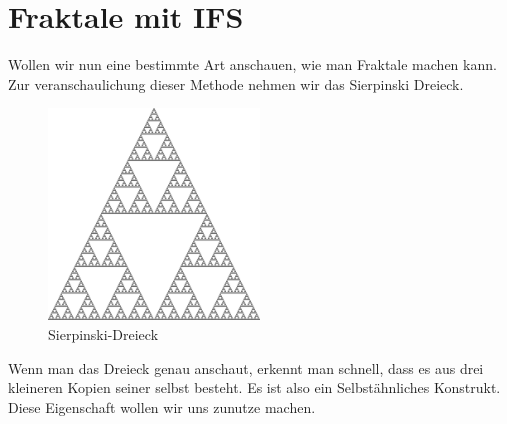 %
%
%
\section{Fraktale mit IFS 
\label{ifs:section:teil2}}
Wollen wir nun eine bestimmte Art anschauen, wie man Fraktale machen kann.
Zur veranschaulichung dieser Methode nehmen wir das Sierpinski Dreieck.
\begin{figure}
	\label{ifs:sierpinski10}
	\centering
	\includegraphics[width=0.5\textwidth]{papers/ifs/images/sierpinski}
	\caption{Sierpinski-Dreieck}
\end{figure}
Wenn man das Dreieck genau anschaut, erkennt man schnell, dass es aus drei kleineren Kopien seiner selbst besteht.
Es ist also ein Selbstähnliches Konstrukt.
Diese Eigenschaft wollen wir uns zunutze machen.


